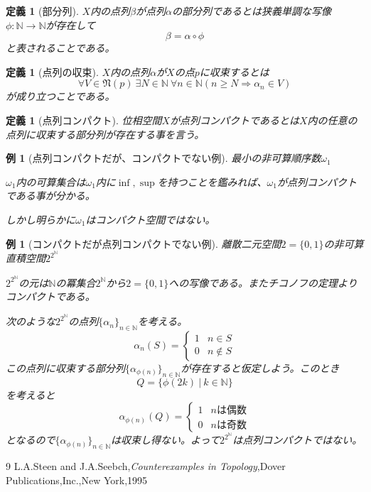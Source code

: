 \documentclass[leqno]{jsarticle}
\newtheorem{df}[thm]{定義}
\newtheorem{exam}[thm]{例}
\newcommand{\To}{\Longrightarrow}
\newcommand{\nn}{\mathbb{N}}
\newcommand{\al}{\alpha}
\newcommand{\be}{\beta}
\begin{document}
\begin{df}[部分列]
$X$内の点列$\be$が点列$\al$の部分列であるとは狭義単調な写像$\phi:\nn\to \nn$が存在して\[
\be=\al \circ \phi
\]
と表されることである。
\end{df}

\begin{df}[点列の収束]
$X$内の点列$\al$が$X$の点$p$に収束するとは
\[
\forall V\in \mathfrak{N}(p)\ \exists N\in\nn\ \forall n\in \nn(n\ge N\To \al_n\in V)
\]
が成り立つことである。
\end{df}

\begin{df}[点列コンパクト]
位相空間$X$が点列コンパクトであるとは$X$内の任意の点列に収束する部分列が存在する事を言う。
\end{df}

\begin{exam}[点列コンパクトだが、コンパクトでない例]
最小の非可算順序数$\omega_1$\par
$\omega_1$内の可算集合は$\omega_1$内に$\inf,\sup$を持つことを鑑みれば、$\omega_1$が点列コンパクトである事が分かる。\par
しかし明らかに$\omega_1$はコンパクト空間ではない。
\end{exam}


\begin{exam}[コンパクトだが点列コンパクトでない例]
離散二元空間$2=\{0,1\}$の非可算直積空間$2^{2^{\nn}}$\par
$2^{2^{\nn}}$の元は$\nn$の冪集合$2^{\nn}$から$2=\{0,1\}$への写像である。またチコノフの定理よりコンパクトである。
\par 次のような$2^{2^{\nn}}$の点列$\{\al_n\}_{n\in \nn}$を考える。
\[
\al_n(S)=
\begin{cases}
1 & \text{$n\in S$}\\ 
0 & \text{$n\not\in S$}
\end{cases}
\]
この点列に収束する部分列$\{\al_{\phi(n)}\}_{n\in \nn}$が存在すると仮定しよう。このとき
\[
Q=\{\phi(2k)\ |\ k\in \nn\}
\]
を考えると
\[
\al_{\phi(n)}(Q)=
\begin{cases}
1 & \text{$n$は偶数}\\ 
0 & \text{$n$は奇数}
\end{cases}
\]
となるので$\{\al_{\phi(n)}\}_{n\in \nn}$は収束し得ない。よって$2^{2^{\nn}}$は点列コンパクトではない。
\end{exam}

















	
\begin{thebibliography}{9}
L.A.Steen and J.A.Seebch,{\it Counterexamples in Topology},Dover Publications,Inc.,New York,1995
\end{thebibliography}




			
\end{document}
